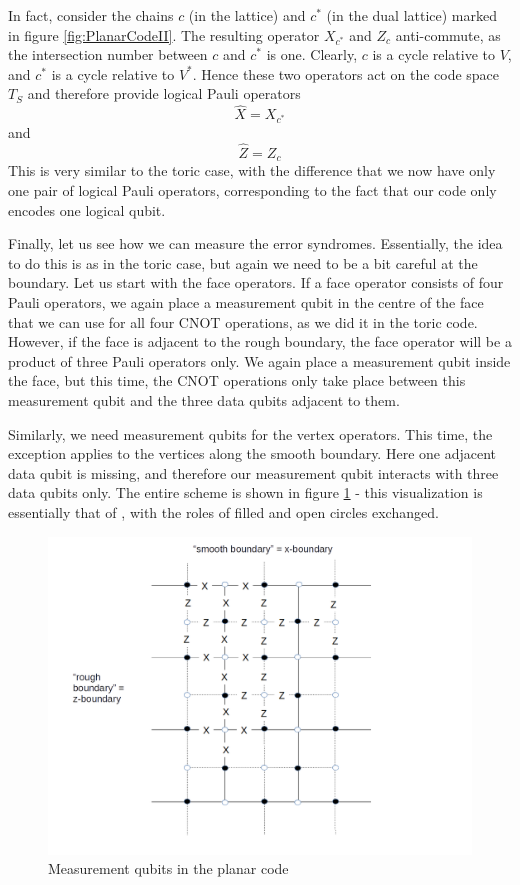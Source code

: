 \documentclass[a4paper, draft]{article}
\theoremstyle{own}
\theoremstyle{remark}
\begin{document}
In fact, consider the chains $c$ (in the lattice) and $c^*$ (in the dual lattice) marked in figure \ref{fig:PlanarCodeII}. The resulting operator $X_{c^*}$ and $Z_c$ anti-commute, as the intersection number between $c$ and $c^*$ is one. Clearly, $c$ is a cycle relative to $V$, and $c^*$ is a cycle relative to $V^*$. Hence these two operators act on the code space $T_S$ and therefore provide logical Pauli operators
$$
\hat{X} = X_{c^*}
$$
and
$$
\hat{Z} = Z_c
$$
This is very similar to the toric case, with the difference that we now have only one pair of logical Pauli operators, corresponding to the fact that our code only encodes one logical qubit.

Finally, let us see how we can measure the error syndromes. Essentially, the idea to do this is as in the toric case, but again we need to be a bit careful at the boundary. Let us start with the face operators. If a face operator consists of four Pauli operators, we again place a measurement qubit in the centre of the face that we can use for all four CNOT operations, as we did it in the toric code. However, if the face is adjacent to the rough boundary, the face operator will be a product of three Pauli operators only. We again place a measurement qubit inside the face, but this time, the CNOT operations only take place between this measurement qubit and the three data qubits adjacent to them. 

Similarly, we need measurement qubits for the vertex operators. This time, the exception applies to the vertices along the smooth boundary. Here one adjacent data qubit is missing, and therefore our measurement qubit interacts with three data qubits only. The entire scheme is shown in figure \ref{fig:PlanarCodeIII} - this visualization is essentially that of \cite{SurfaceCodes}, with the roles of filled and open circles exchanged. 

\begin{figure}[ht]
\centering
\includegraphics[width=0.7\linewidth]{images/PlanarCodeIII}
\caption[Measurement qubits in the planar code]{Measurement qubits in the planar code}
\label{fig:PlanarCodeIII}
\end{figure}
\end{document}
